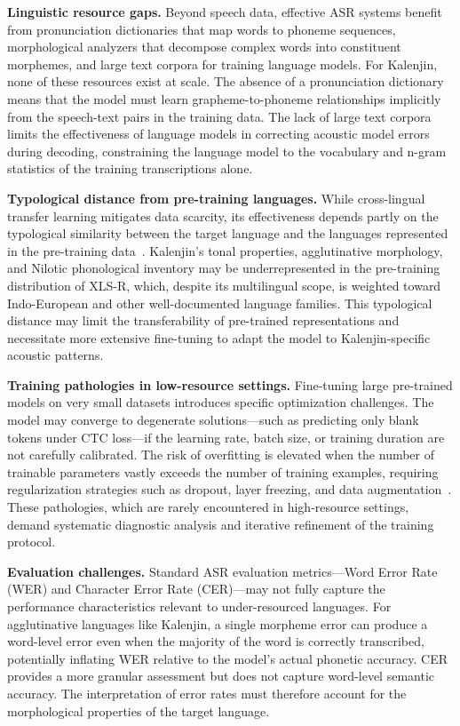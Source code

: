 \documentclass[journal]{IEEEtran}
\begin{document}
\textbf{Linguistic resource gaps.} Beyond speech data, effective ASR systems benefit from pronunciation dictionaries that map words to phoneme sequences, morphological analyzers that decompose complex words into constituent morphemes, and large text corpora for training language models. For Kalenjin, none of these resources exist at scale. The absence of a pronunciation dictionary means that the model must learn grapheme-to-phoneme relationships implicitly from the speech-text pairs in the training data. The lack of large text corpora limits the effectiveness of language models in correcting acoustic model errors during decoding, constraining the language model to the vocabulary and n-gram statistics of the training transcriptions alone.

\textbf{Typological distance from pre-training languages.} While cross-lingual transfer learning mitigates data scarcity, its effectiveness depends partly on the typological similarity between the target language and the languages represented in the pre-training data~\cite{conneau2021unsupervised, yi2020applying}. Kalenjin's tonal properties, agglutinative morphology, and Nilotic phonological inventory may be underrepresented in the pre-training distribution of XLS-R, which, despite its multilingual scope, is weighted toward Indo-European and other well-documented language families. This typological distance may limit the transferability of pre-trained representations and necessitate more extensive fine-tuning to adapt the model to Kalenjin-specific acoustic patterns.

\textbf{Training pathologies in low-resource settings.} Fine-tuning large pre-trained models on very small datasets introduces specific optimization challenges. The model may converge to degenerate solutions---such as predicting only blank tokens under CTC loss---if the learning rate, batch size, or training duration are not carefully calibrated. The risk of overfitting is elevated when the number of trainable parameters vastly exceeds the number of training examples, requiring regularization strategies such as dropout, layer freezing, and data augmentation~\cite{park2019specaugment}. These pathologies, which are rarely encountered in high-resource settings, demand systematic diagnostic analysis and iterative refinement of the training protocol.

\textbf{Evaluation challenges.} Standard ASR evaluation metrics---Word Error Rate (WER) and Character Error Rate (CER)---may not fully capture the performance characteristics relevant to under-resourced languages. For agglutinative languages like Kalenjin, a single morpheme error can produce a word-level error even when the majority of the word is correctly transcribed, potentially inflating WER relative to the model's actual phonetic accuracy. CER provides a more granular assessment but does not capture word-level semantic accuracy. The interpretation of error rates must therefore account for the morphological properties of the target language.
\end{document}
